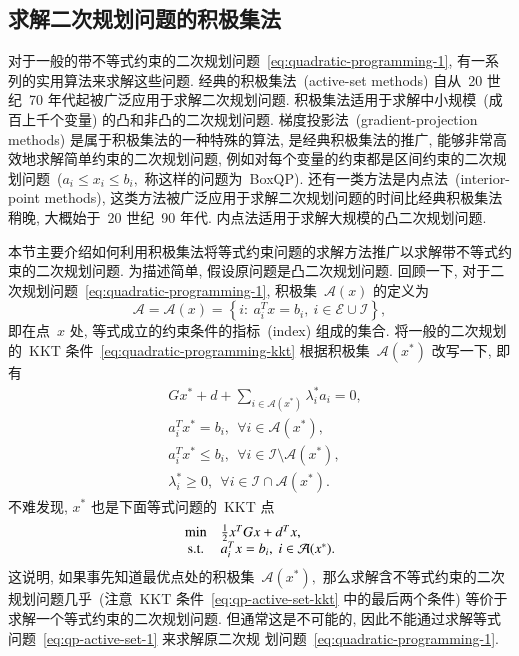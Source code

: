 \documentclass{SBCbookchapter}
\numberwithin{equation}{section}
\begin{document}
\subsection{求解二次规划问题的积极集法}
\label{subsec:7.2.2}

对于一般的带不等式约束的二次规划问题~\eqref{eq:quadratic-programming-1}, 有一系列的实用算法来求解这些问题. 经典的积极集法~(active-set methods) 自从~20 世纪~70 年代起被广泛应用于求解二次规划问题. 积极集法适用于求解中小规模~(成百上千个变量) 的凸和非凸的二次规划问题. 梯度投影法~(gradient-projection methods) 是属于积极集法的一种特殊的算法, 是经典积极集法的推广, 能够非常高效地求解简单约束的二次规划问题, 例如对每个变量的约束都是区间约束的二次规划问题~($a_i \leqslant x_i \leqslant b_i,$ 称这样的问题为~BoxQP). 还有一类方法是内点法~(interior-point methods), 这类方法被广泛应用于求解二次规划问题的时间比经典积极集法稍晚, 大概始于~20 世纪~90 年代. 内点法适用于求解大规模的凸二次规划问题.

本节主要介绍如何利用积极集法将等式约束问题的求解方法推广以求解带不等式约束的二次规划问题. 为描述简单, 假设原问题是凸二次规划问题. 回顾一下, 对于二次规划问题~\eqref{eq:quadratic-programming-1}, 积极集~$\mathcal{A}(x)$ 的定义为
\begin{equation}
\label{eq:qp-active-set}
\mathcal{A} = \mathcal{A}({x}) = \left\{ i : ~ {a}_i^T {x} = b_i, ~ i \in \mathcal{E} \cup \mathcal{I} \right\},
\end{equation}
即在点~${x}$ 处, 等式成立的约束条件的指标~(index) 组成的集合.
将一般的二次规划的~KKT 条件~\eqref{eq:quadratic-programming-kkt} 根据积极集~$\mathcal{A}({x}^*)$ 改写一下, 即有
\begin{equation}
\label{eq:qp-active-set-kkt}
\begin{aligned}
& G {x}^* + d + \sum\limits_{i \in \mathcal{A}({x}^*)} \lambda_i^* {a}_i = {0}, \\
& {a}_i^T {x}^* = b_i, ~~ \forall i \in \mathcal{A}({x}^*), \\
& {a}_i^T {x}^* \leqslant b_i, ~~ \forall i \in \mathcal{I} \setminus \mathcal{A}({x}^*), \\
& \lambda_i^* \geqslant 0, ~~ \forall i \in \mathcal{I} \cap \mathcal{A}({x}^*).
\end{aligned}
\end{equation}
不难发现, ${x}^*$ 也是下面等式问题的~KKT 点
\begin{equation}
\label{eq:qp-active-set-1}
\begin{array}{cl}
\min & \frac{1}{2} {x}^T G {x} + {d}^T {x}, \\
{\rm s.t.} & {a}_i^T {x} = b_i, ~ i \in \mathcal{A}({x}^*).
\end{array}
\end{equation}
这说明, 如果事先知道最优点处的积极集~$\mathcal{A}({x}^*),$ 那么求解含不等式约束的二次规划问题几乎~(注意~KKT 条件~\eqref{eq:qp-active-set-kkt} 中的最后两个条件) 等价于求解一个等式约束的二次规划问题. 但通常这是不可能的, 因此不能通过求解等式问题~\eqref{eq:qp-active-set-1} 来求解原二次规
划问题~\eqref{eq:quadratic-programming-1}.
\end{document}
